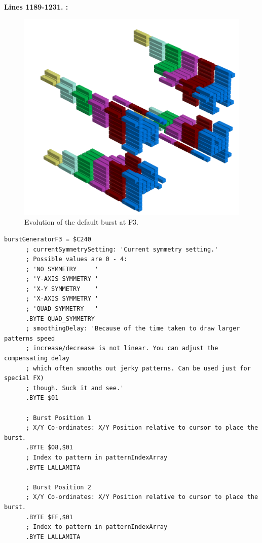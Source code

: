 \textbf{Lines 1189-1231. :} 
\clearpage

\clearpage
\begin{figure}[H]
    \centering
    \begin{adjustbox}{width=12cm,center}
      \includegraphics[width=12cm]{src/patterns/bursts/pattern2-45.png}%
    \end{adjustbox}
\caption{Evolution of the default burst at F3.}
\end{figure}
\clearpage

\begin{lstlisting}[caption=Source code for the F3 Burst.]
burstGeneratorF3 = $C240
      ; currentSymmetrySetting: 'Current symmetry setting.'
      ; Possible values are 0 - 4:
      ; 'NO SYMMETRY     '
      ; 'Y-AXIS SYMMETRY '
      ; 'X-Y SYMMETRY    '
      ; 'X-AXIS SYMMETRY '
      ; 'QUAD SYMMETRY   '
      .BYTE QUAD_SYMMETRY
      ; smoothingDelay: 'Because of the time taken to draw larger patterns speed
      ; increase/decrease is not linear. You can adjust the compensating delay
      ; which often smooths out jerky patterns. Can be used just for special FX)
      ; though. Suck it and see.'
      .BYTE $01

      ; Burst Position 1  
      ; X/Y Co-ordinates: X/Y Position relative to cursor to place the burst.
      .BYTE $08,$01
      ; Index to pattern in patternIndexArray
      .BYTE LALLAMITA

      ; Burst Position 2
      ; X/Y Co-ordinates: X/Y Position relative to cursor to place the burst.
      .BYTE $FF,$01
      ; Index to pattern in patternIndexArray
      .BYTE LALLAMITA

\end{lstlisting}

